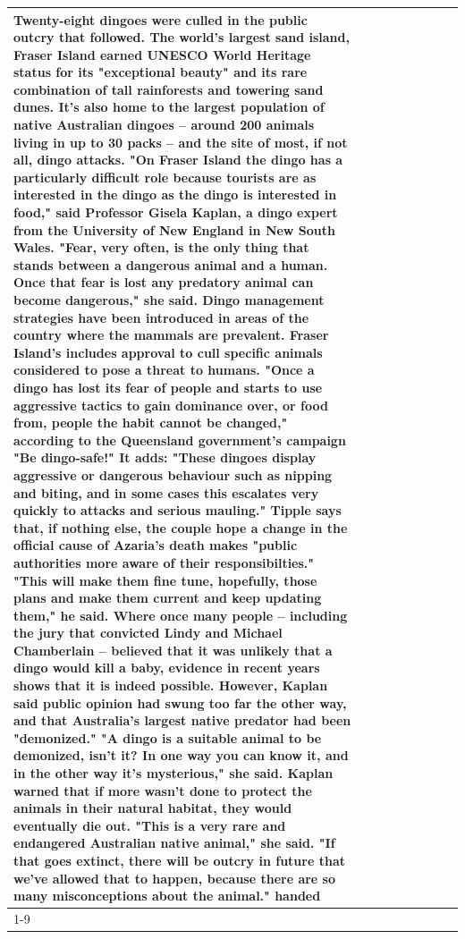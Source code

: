 \begin{table}[H]
\begin{tabular}{lllrlllll}
Twenty-eight dingoes were culled in the public outcry that followed. The world's largest sand island, Fraser Island earned UNESCO World Heritage status for its "exceptional beauty" and its rare combination of tall rainforests and towering sand dunes. It's also home to the largest population of native Australian dingoes -- around 200 animals living in up to 30 packs -- and the site of most, if not all, dingo attacks. "On Fraser Island the dingo has a particularly difficult role because tourists are as interested in the dingo as the dingo is interested in food," said Professor Gisela Kaplan, a dingo expert from the University of New England in New South Wales. "Fear, very often, is the only thing that stands between a dangerous animal and a human. Once that fear is lost any predatory animal can become dangerous," she said. Dingo management strategies have been introduced in areas of the country where the mammals are prevalent. Fraser Island's includes approval to cull specific animals considered to pose a threat to humans. "Once a dingo has lost its fear of people and starts to use aggressive tactics to gain dominance over, or food from, people the habit cannot be changed," according to the Queensland government's campaign "Be dingo-safe!" It adds: "These dingoes display aggressive or dangerous behaviour such as nipping and biting, and in some cases this escalates very quickly to attacks and serious mauling." Tipple says that, if nothing else, the couple hope a change in the official cause of Azaria's death makes "public authorities more aware of their responsibilties." "This will make them fine tune, hopefully, those plans and make them current and keep updating them," he said. Where once many people -- including the jury that convicted Lindy and Michael Chamberlain -- believed that it was unlikely that a dingo would kill a baby, evidence in recent years shows that it is indeed possible. However, Kaplan said public opinion had swung too far the other way, and that Australia's largest native predator had been "demonized." "A dingo is a suitable animal to be demonized, isn't it? In one way you can know it, and in the other way it's mysterious," she said. Kaplan warned that if more wasn't done to protect the animals in their natural habitat, they would eventually die out. "This is a very rare and endangered Australian native animal," she said. "If that goes extinct, there will be outcry in future that we've allowed that to happen, because there are so many misconceptions about the animal." handed \\
\cline{1-9}

\end{tabular}
\end{table}
